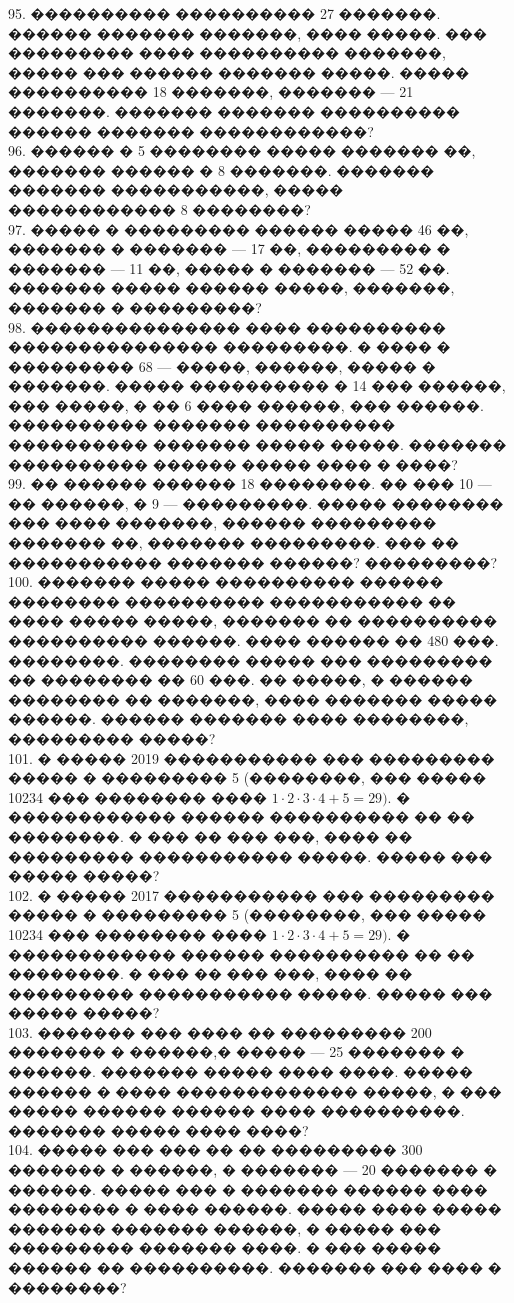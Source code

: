 \documentclass[12pt]{article}
\begin{document}
95. ���������� ���������� 27 �������. ������ ������� �������, ���� �����. ��� ��������� ���� ���������� �������, ����� ��� ������ ������� �����. ����� ���������� 18 �������, ������� --- 21 �������. ������� ������� ���������� ������ ������� ������������?\\
96. ������ � 5 �������� ����� ������� ��, ������� ������ � 8 �������. ������� ������� �����������, ����� ������������ 8 ��������?\\
97. ����� � ��������� ������ ����� 46 ��, ������� � ������� --- 17 ��, ��������� � ������� --- 11 ��, ����� � ������� --- 52 ��. ������� ����� ������ �����, �������, ������� � ���������?\\
98. ��������������� ���� ���������� ��������������� ���������. � ���� � ��������� 68 --- �����, ������, ����� � �������. ����� ���������� � 14 ��� ������, ��� �����, � �� 6 ���� ������, ��� ������. ���������� ������� ���������� ���������� ������� ����� �����. ������� ���������� ������ ����� ���� � ����?\\
99. �� ������ ������ 18 ��������. �� ��� 10 --- �� ������, � 9 --- ���������. ����� �������� ��� ���� �������, ������ ��������� ������� ��, ������� ���������. ��� �� ����������� ������� ������? ���������?\\
100. ������� ����� ���������� ������ �������� ���������� ����������� �� ���� ����� �����, ������� �� ���������� ���������� ������. ���� ������ �� 480 ���. ��������. �������� ����� ��� ��������� �� �������� �� 60 ���. �� �����, � ������ �������� �� �������, ���� ������� ����� ������. ������ ������� ���� ��������, ��������� �����?\\
101. � ����� 2019 ����������� ��� ��������� ����� � ��������� 5 (��������, ��� ����� 10234 ��� �������� ���� $1\cdot2\cdot3\cdot4+5=29).$ � ������������ ������ ���������� �� �� ��������. � ��� �� ��� ���, ���� �� ��������� ����������� �����. ����� ��� ����� �����?\\
102. � ����� 2017 ����������� ��� ��������� ����� � ��������� 5 (��������, ��� ����� 10234 ��� �������� ���� $1\cdot2\cdot3\cdot4+5=29).$ � ������������ ������ ���������� �� �� ��������. � ��� �� ��� ���, ���� �� ��������� ����������� �����. ����� ��� ����� �����?\\
103. ������� ��� ���� �� ��������� 200 ������� � ������,� ����� --- 25 ������� � ������. ������� ����� ���� ����. ����� ������ � ���� ������������� �����, � ��� ����� ������ ������ ���� ����������. ������� ����� ���� ����?\\
104. ����� ��� ��� �� �� ��������� 300 ������� � ������, � ������� --- 20 ������� � ������. ����� ��� � ������� ������ ���� �������� � ���� ������. ����� ���� ����� ������� ������� ������, � ����� ��� ��������� ������� ����. � ��� ����� ������ �� ����������. ������� ��� ���� � ��������?\\
\end{document}
